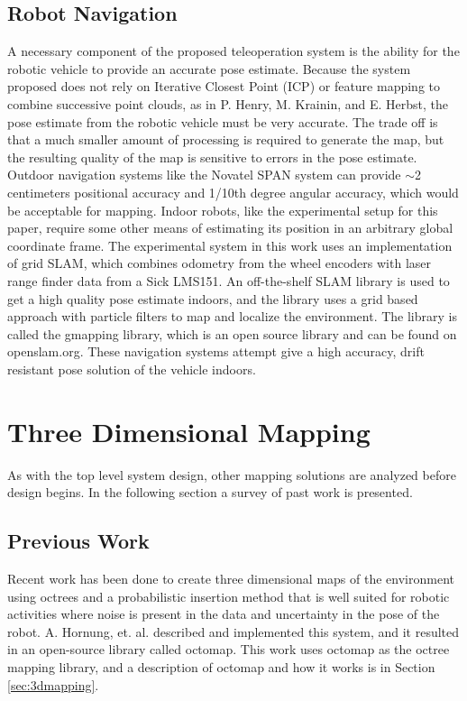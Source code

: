 \documentclass[12pt]{report}
\begin{document}
\section{Robot Navigation}
A necessary component of the proposed teleoperation system is the ability for the robotic vehicle to provide an accurate pose estimate.  Because the system proposed does not rely on Iterative Closest Point (ICP) or feature mapping to combine successive point clouds, as in P. Henry, M. Krainin, and E. Herbst\cite{Henry2010}, the pose estimate from the robotic vehicle must be very accurate.  The trade off is that a much smaller amount of processing is required to generate the map, but the resulting quality of the map is sensitive to errors in the pose estimate.  Outdoor navigation systems like the Novatel SPAN system can provide $\sim$2 centimeters positional accuracy and 1/10th degree angular accuracy\cite{kennedy2006architecture}, which would be acceptable for mapping.  Indoor robots, like the experimental setup for this paper, require some other means of estimating its position in an arbitrary global coordinate frame.  The experimental system in this work uses an implementation of grid SLAM, which combines odometry from the wheel encoders with laser range finder data from a Sick LMS151.  An off-the-shelf SLAM library is used to get a high quality pose estimate indoors, and the library uses a grid based approach with particle filters to map and localize the environment.  The library is called the gmapping library\cite{grisetti2007improved}\cite{grisettiyz2005improving}, which is an open source library and can be found on openslam.org.  These navigation systems attempt give a high accuracy, drift resistant pose solution of the vehicle indoors.


\chapter{Three Dimensional Mapping}\label{chap:3d_mapping}
As with the top level system design, other mapping solutions are analyzed before design begins.  In the following section a survey of past work is presented.

\section{Previous Work}
\label{sec:previouswork_3dmapping}
Recent work has been done to create three dimensional maps of the environment using octrees and a probabilistic insertion method that is well suited for robotic activities where noise is present in the data and uncertainty in the pose of the robot. A. Hornung, et. al. described and implemented this system, and it resulted in an open-source library called octomap.\cite{octomap} This work uses octomap as the octree mapping library, and a description of octomap and how it works is in Section \ref{sec:3dmapping}.
\end{document}
